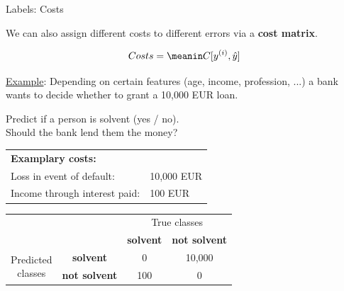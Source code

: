 \begin{vbframe}{Labels: Costs}

\small

We can also assign different costs to different errors via a 
\textbf{cost matrix}.

$$
  Costs = \meanin C[\yi, \yih]
$$

\underline{Example}: %
Depending on certain features (age, income, profession, ...) a bank wants to 
decide whether to grant a 10,000 EUR loan.\\ 

\medskip

Predict if a person is solvent (yes / no).\\ 
Should the bank lend them the money?\\

\medskip
  \begin{tabular}{ll}
    \textbf{Examplary costs:} & \\
    Loss in event of default: & 10,000 EUR\\
    Income through interest paid: & 100 EUR\\
  \end{tabular}
 
\begin{table}[ht]
  \small
  \begin{tabular}{cccc}
    \hline
    & &\multicolumn{2}{c}{True classes} \\ 
    & &\textbf{solvent} & \textbf{not solvent}  \\ 
    \hline
    \multirow{2}{*}{\parbox{1cm}{Predicted \\ classes}}& \textbf{solvent}     & 0                 & 10,000\\
    & \textbf{not solvent} & 100               & 0\\
    \hline
\end{tabular}
\end{table}
 
\end{vbframe}


